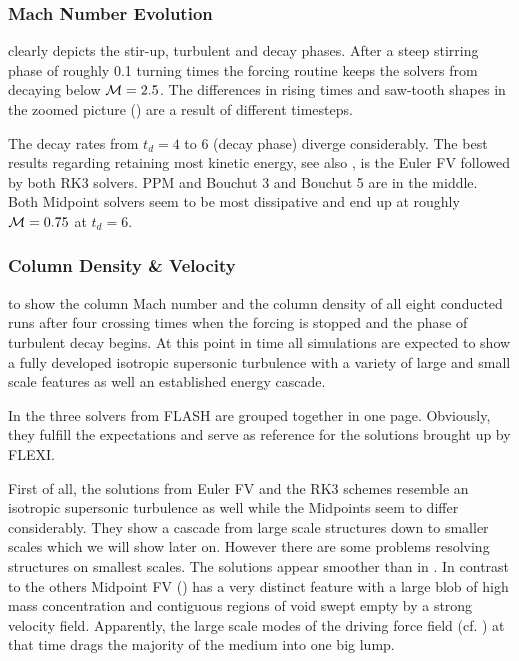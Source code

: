 \subsubsection{Mach Number Evolution}
 clearly depicts the stir-up,
turbulent and decay phases. After a steep stirring phase of roughly 0.1 turning
times the forcing routine keeps the solvers from decaying below $\mathcal{M} = 2.5$.
The differences in rising times and saw-tooth shapes in the zoomed picture
() are a result of
different timesteps.

The decay rates from $t_d = 4$ to 6 (decay phase) diverge considerably.
The best results regarding retaining most kinetic energy, see also
, is the Euler FV followed by both RK3
solvers. PPM and Bouchut 3 and Bouchut 5 are in the middle. Both
Midpoint solvers seem to be most dissipative and end up at roughly $\mathcal{M} =
0.75$ at $t_d = 6$.

\subsubsection{Column Density \& Velocity}
\label{sec:stirturb-column-plots}
 to
 show the column Mach number
and the column density of all eight conducted runs after four crossing times
when the forcing is stopped and the phase of turbulent decay begins. At this
point in time all simulations are expected to show a fully developed
isotropic supersonic turbulence with a variety of large and small scale
features as well an established energy cascade.

In  the three solvers from
FLASH are grouped together in one page. Obviously, they fulfill the
expectations and serve as reference for the solutions brought up by FLEXI.

First of all, the solutions from Euler FV and the RK3 schemes resemble an
isotropic supersonic turbulence as well while the Midpoints seem to differ
considerably. They show a cascade from large scale structures down to smaller
scales which we will show later on. However there are some problems resolving
structures on smallest scales. The solutions appear smoother than in
. In contrast to the others
Midpoint FV () has a very
distinct feature with a large blob of high mass concentration and
contiguous regions of void swept empty by a strong velocity field.
Apparently, the large scale modes of the driving force field (cf. )
at that time drags the majority of the medium into one big lump. 

